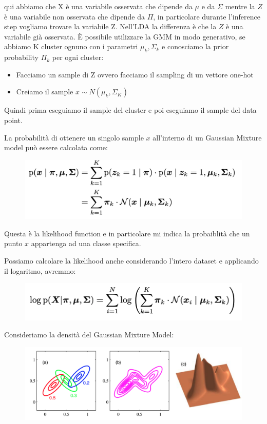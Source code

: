 \documentclass[14pt]{extreport}
\begin{document}
qui abbiamo che X è una variabile osservata che dipende da $\mu$ e da $\Sigma$ mentre la $Z$ è una variabile non osservata che dipende da $\Pi$, in particolare 
durante l'inference step vogliamo trovare la variabile Z.
Nell'LDA la differenza è che la $Z$ è una variabile già osservata.
È possibile utilizzare la GMM in modo generativo, se abbiamo K cluster ognuno con i parametri $\mu_k, \Sigma_k$ e conosciamo la prior probability $\Pi_k$ per 
ogni cluster:

\begin{itemize}
\item Facciamo un sample di Z ovvero facciamo il sampling di un vettore one-hot
\item Creiamo il sample $x \sim N(\mu_k, \Sigma_K)$
\end{itemize}

Quindi prima eseguiamo il sample del cluster e poi eseguiamo il sample del data point.

La probabilità di ottenere un singolo sample $x$ all'interno di un Gaussian Mixture model può essere calcolata come:


\begin{figure}[H] 
\centering
\includegraphics[width=0.7\linewidth]{540.jpeg}
\end{figure}

Questa è la likelihood function e in particolare mi indica la probaiblità che un punto $x$ appartenga 
ad una classe specifica.

Possiamo calcolare la likelihood anche considerando l'intero dataset e applicando il logaritmo, avremmo:

\begin{figure}[H] 
\centering
\includegraphics[width=0.7\linewidth]{541.jpeg}
\end{figure}

Consideriamo la densità del Gaussian Mixture Model:

\begin{figure}[H] 
\centering
\includegraphics[width=0.7\linewidth]{542.jpeg}
\end{figure}
\end{document}
